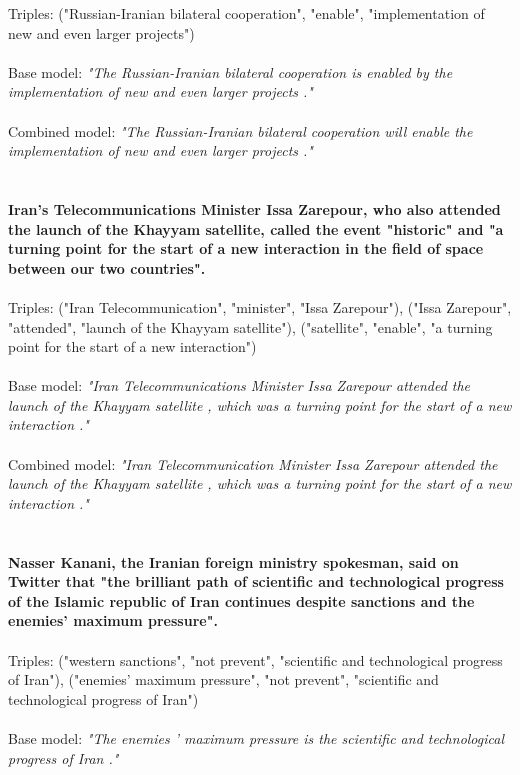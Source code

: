 \documentclass[
hf, %
]{ceurart}
\begin{document}
\noindent
Triples: ("Russian-Iranian bilateral cooperation", "enable", "implementation of new and even larger projects")\\\\
\noindent
Base model: \textit{"The Russian-Iranian bilateral cooperation is enabled by the implementation of new and even larger projects ."}\\\\
\noindent
Combined model: \textit{"The Russian-Iranian bilateral cooperation will enable the implementation of new and even larger projects ."}\\\\\\
\noindent
\textbf{Iran's Telecommunications Minister Issa Zarepour, who also attended the launch of the Khayyam satellite, called the event "historic" and "a turning point for the start of a new interaction in the field of space between our two countries".}\\\\
\noindent
Triples: ("Iran Telecommunication", "minister", "Issa Zarepour"), ("Issa Zarepour", "attended", "launch of the Khayyam satellite"), ("satellite", "enable", "a turning point for the start of a new interaction")\\\\
\noindent
Base model: \textit{"Iran Telecommunications Minister Issa Zarepour attended the launch of the Khayyam satellite , which was a turning point for the start of a new interaction ."}\\\\
\noindent
Combined model: \textit{"Iran Telecommunication Minister Issa Zarepour attended the launch of the Khayyam satellite , which was a turning point for the start of a new interaction ."}\\\\\\
\noindent
\textbf{Nasser Kanani, the Iranian foreign ministry spokesman, said on Twitter that "the brilliant path of scientific and technological progress of the Islamic republic of Iran continues despite sanctions and the enemies' maximum pressure".}\\\\
\noindent
Triples: ("western sanctions", "not prevent", "scientific and technological progress of Iran"), ("enemies' maximum pressure", "not prevent", "scientific and technological progress of Iran")\\\\
\noindent
Base model: \textit{"The enemies ' maximum pressure is the scientific and technological progress of Iran ."}\\\\
\end{document}

